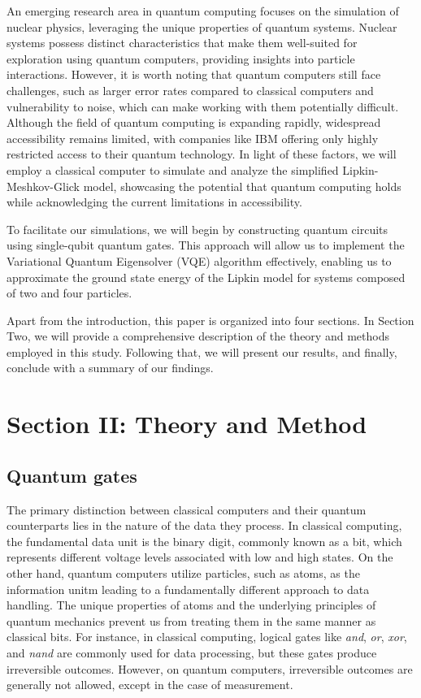 \documentclass[onecolumn,10pt,cleanfoot]{asme2ej}
\begin{document}
An emerging research area in quantum computing focuses on the simulation of nuclear physics, leveraging the unique properties of quantum systems. Nuclear systems possess distinct characteristics that make them well-suited for exploration using quantum computers, providing insights into particle interactions. However, it is worth noting that quantum computers still face challenges, such as larger error rates compared to classical computers and vulnerability to noise, which can make working with them potentially difficult. Although the field of quantum computing is expanding rapidly, widespread accessibility remains limited, with companies like IBM offering only highly restricted access to their quantum technology. In light of these factors, we will employ a classical computer to simulate and analyze the simplified Lipkin-Meshkov-Glick model, showcasing the potential that quantum computing holds while acknowledging the current limitations in accessibility.

To facilitate our simulations, we will begin by constructing quantum circuits using single-qubit quantum gates. This approach will allow us to implement the Variational Quantum Eigensolver (VQE) algorithm effectively, enabling us to approximate the ground state energy of the Lipkin model for systems composed of two and four particles.

Apart from the introduction, this paper is organized into four sections. In Section Two, we will provide a comprehensive description of the theory and methods employed in this study. Following that, we will present our results, and finally, conclude with a summary of our findings.
 
 \section{\textbf{Section II: Theory and Method \\}}

 \subsection{Quantum gates}
The primary distinction between classical computers and their quantum counterparts lies in the nature of the data they process. In classical computing, the fundamental data unit is the binary digit, commonly known as a bit, which represents different voltage levels associated with low and high states. On the other hand, quantum computers utilize particles, such as atoms, as the information unitm leading to a fundamentally different approach to data handling. The unique properties of atoms and the underlying principles of quantum mechanics prevent us from treating them in the same manner as classical bits. For instance, in classical computing, logical gates like \textit{and}, \textit{or}, \textit{xor}, and \textit{nand} are commonly used for data processing, but these gates produce irreversible outcomes. However, on quantum computers, irreversible outcomes are generally not allowed, except in the case of measurement.
\end{document}
